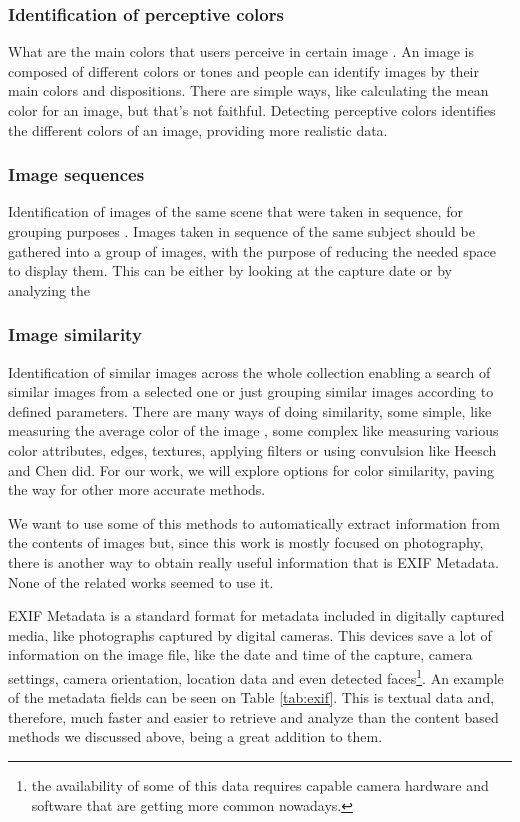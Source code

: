 	
\subsubsection{Identification of perceptive colors}
What are the main colors that users perceive in certain image \cite{Sural:2002bt,Tan:2001p850}. An image is composed of different colors or tones and people can identify images by their main colors and dispositions. There are simple ways, like calculating the mean color for an image, but that's not faithful. Detecting perceptive colors identifies the different colors of an image, providing more realistic data.

\subsubsection{Image sequences }
Identification of images of the same scene that were taken in sequence, for grouping purposes \cite{Cooper:2003p3679}. Images taken in sequence of the same subject should be gathered into a group of images, with the purpose of reducing the needed space to display them. This can be either by looking at the capture date or by analyzing the 

\subsubsection{Image similarity }
Identification of similar images across the whole collection enabling a search of similar images from a selected one or just grouping similar images according to defined parameters. There are many ways of doing similarity, some simple, like measuring the average color of the image \cite{Strong:2009p413,Qiu:2007p1207,Schaefer:2010p1871}, some complex like measuring various color attributes, edges, textures, applying filters or using convulsion like Heesch \cite{Heesch:2004p2675} and Chen \cite{Chen:1998p2344} did. For our work, we will explore options for color similarity, paving the way for other more accurate methods.

\vspace{\baselineskip}

We want to use some of this methods to automatically extract information from the contents of images but, since this work is mostly focused on photography, there is another way to obtain really useful information that is EXIF Metadata. None of the related works seemed to use it.

EXIF Metadata is a standard format for metadata included in digitally captured media, like photographs captured by digital cameras. This devices save a lot of information on the image file, like the date and time of the capture, camera settings, camera orientation, location data and even detected faces\footnote{the availability of some of this data requires capable camera hardware and software that are getting more common nowadays.}. An example of the metadata fields can be seen on Table \ref{tab:exif}. This is textual data and, therefore, much faster and easier to retrieve and analyze than the content based methods we discussed above, being a great addition to them.

